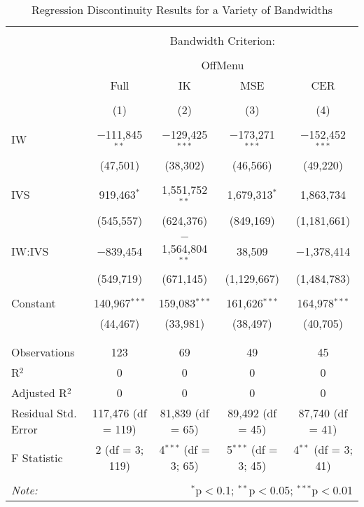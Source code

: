 
\begin{table}[H] \centering 
  \caption{Regression Discontinuity Results for a Variety of Bandwidths} 
  \label{rdd_cutoff_table} 
\small 
\begin{tabular}{@{\extracolsep{0pt}}lcccc} 
\\[-1.8ex]\hline 
\hline \\[-1.8ex] 
 & \multicolumn{4}{c}{Bandwidth Criterion:} \\ 
\cline{2-5} 
\\[-1.8ex] & \multicolumn{4}{c}{OffMenu} \\ 
 & Full & IK & MSE & CER \\ 
\\[-1.8ex] & (1) & (2) & (3) & (4)\\ 
\hline \\[-1.8ex] 
 IW & $-$111,845$^{**}$ & $-$129,425$^{***}$ & $-$173,271$^{***}$ & $-$152,452$^{***}$ \\ 
  & (47,501) & (38,302) & (46,566) & (49,220) \\ 
  & & & & \\ 
 IVS & 919,463$^{*}$ & 1,551,752$^{**}$ & 1,679,313$^{*}$ & 1,863,734 \\ 
  & (545,557) & (624,376) & (849,169) & (1,181,661) \\ 
  & & & & \\ 
 IW:IVS & $-$839,454 & $-$1,564,804$^{**}$ & 38,509 & $-$1,378,414 \\ 
  & (549,719) & (671,145) & (1,129,667) & (1,484,783) \\ 
  & & & & \\ 
 Constant & 140,967$^{***}$ & 159,083$^{***}$ & 161,626$^{***}$ & 164,978$^{***}$ \\ 
  & (44,467) & (33,981) & (38,497) & (40,705) \\ 
  & & & & \\ 
\hline \\[-1.8ex] 
Observations & 123 & 69 & 49 & 45 \\ 
R$^{2}$ & 0 & 0 & 0 & 0 \\ 
Adjusted R$^{2}$ & 0 & 0 & 0 & 0 \\ 
Residual Std. Error & 117,476 (df = 119) & 81,839 (df = 65) & 89,492 (df = 45) & 87,740 (df = 41) \\ 
F Statistic & 2 (df = 3; 119) & 4$^{***}$ (df = 3; 65) & 5$^{***}$ (df = 3; 45) & 4$^{**}$ (df = 3; 41) \\ 
\hline 
\hline \\[-1.8ex] 
\textit{Note:}  & \multicolumn{4}{r}{$^{*}$p$<$0.1; $^{**}$p$<$0.05; $^{***}$p$<$0.01} \\ 
\end{tabular} 
\end{table} 
